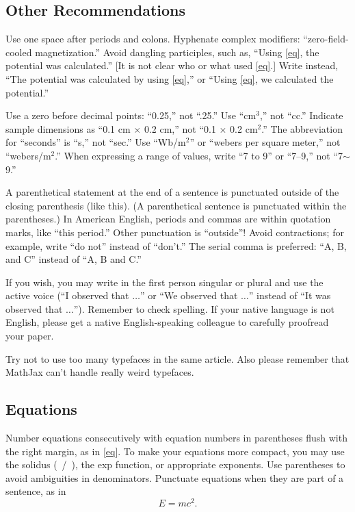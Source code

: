 \documentclass{ieeeaccess}
\begin{document}
\subsection{Other Recommendations}
Use one space after periods and colons. Hyphenate complex modifiers:
``zero-field-cooled magnetization.'' Avoid dangling participles, such as,
``Using \eqref{eq}, the potential was calculated.'' [It is not clear who or what
used \eqref{eq}.] Write instead, ``The potential was calculated by using \eqref{eq},'' or
``Using \eqref{eq}, we calculated the potential.''

Use a zero before decimal points: ``0.25,'' not ``.25.'' Use
``cm$^{3}$,'' not ``cc.'' Indicate sample dimensions as ``0.1 cm
$\times $ 0.2 cm,'' not ``0.1 $\times $ 0.2 cm$^{2}$.'' The
abbreviation for ``seconds'' is ``s,'' not ``sec.'' Use
``Wb/m$^{2}$'' or ``webers per square meter,'' not
``webers/m$^{2}$.'' When expressing a range of values, write ``7 to
9'' or ``7--9,'' not ``7$\sim $9.''

A parenthetical statement at the end of a sentence is punctuated outside of
the closing parenthesis (like this). (A parenthetical sentence is punctuated
within the parentheses.) In American English, periods and commas are within
quotation marks, like ``this period.'' Other punctuation is ``outside''!
Avoid contractions; for example, write ``do not'' instead of ``don't.'' The
serial comma is preferred: ``A, B, and C'' instead of ``A, B and C.''

If you wish, you may write in the first person singular or plural and use
the active voice (``I observed that $\ldots$'' or ``We observed that $\ldots$''
instead of ``It was observed that $\ldots$''). Remember to check spelling. If
your native language is not English, please get a native English-speaking
colleague to carefully proofread your paper.

Try not to use too many typefaces in the same article. Also please remember that MathJax
can't handle really weird typefaces.

\subsection{Equations}
Number equations consecutively with equation numbers in parentheses flush
with the right margin, as in \eqref{eq}. To make your equations more
compact, you may use the solidus (~/~), the exp function, or appropriate
exponents. Use parentheses to avoid ambiguities in denominators. Punctuate
equations when they are part of a sentence, as in
\begin{equation}E=mc^2.\label{eq}\end{equation}
\end{document}
